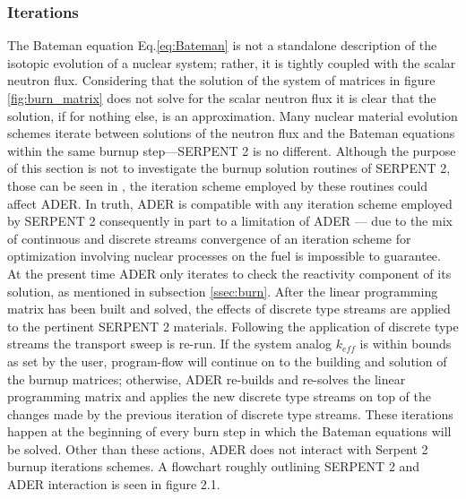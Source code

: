 \subsubsection{Iterations} \label{sssec:iter}
The Bateman equation Eq.\ref{eq:Bateman} is not a standalone description of the
isotopic evolution of a nuclear system; rather, it is tightly coupled with the
scalar neutron flux. Considering that the solution of the system of matrices
in figure \ref{fig:burn_matrix} does not solve for the scalar neutron flux
it is clear that the solution, if for nothing else, is an approximation. Many
nuclear material evolution schemes iterate between solutions of the neutron
flux and the Bateman equations within the same burnup step---SERPENT 2 is no 
different. Although the purpose of
this section is not to investigate the burnup solution routines of SERPENT 2, 
those
can be seen in \cite{leppanen_burnup_2009}, the iteration scheme employed by
these routines could affect ADER. In truth, ADER is compatible with any
iteration scheme employed by SERPENT 2 consequently in part to a limitation 
of ADER ---
due to the mix of continuous and discrete streams convergence of an iteration
scheme for optimization involving nuclear processes on the fuel is impossible
to guarantee. At the present time ADER only iterates to check the reactivity 
component of its solution, as mentioned in subsection \ref{ssec:burn}. 
After the linear programming
matrix has been built and solved, the effects of discrete type streams are
applied to the pertinent SERPENT 2 materials. Following the application 
of discrete type streams the transport sweep is re-run. If the system analog 
$k_{eff}$ is within bounds as set by the user, program-flow will continue on to
the building and solution of the burnup matrices; otherwise, ADER re-builds
and re-solves the linear programming matrix and applies the new discrete type
streams on top of the changes made by the previous iteration of discrete 
type streams. These iterations happen at the beginning of every burn step in 
which the Bateman equations will be solved. Other than these actions, ADER 
does not
interact with Serpent 2 burnup iterations schemes. A flowchart roughly outlining
SERPENT 2 and ADER interaction is seen in figure 2.1.

